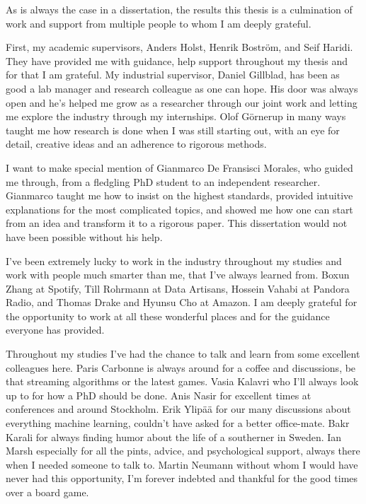 \begin{acknowledgements}


As is always the case in a dissertation, the results this thesis is
a culmination of work and support from multiple people to whom I am
deeply grateful.

First, my academic supervisors, Anders Holst, Henrik Bostr\"{o}m, and Seif Haridi.
They have provided me with guidance, help support throughout my thesis and for
that I am grateful.
My industrial supervisor, Daniel Gillblad, has been as good a lab manager and
research colleague as one can hope. His door was always open and he's helped me
grow as a researcher through our joint work and letting me explore the industry through my
internships. Olof G\"{o}rnerup in many ways taught me how research is done when I
was still starting out, with an eye for detail, creative ideas and an adherence to rigorous
methods.

I want to make special mention of Gianmarco De Fransisci Morales, who
guided me through, from a fledgling PhD student to an independent researcher.
Gianmarco taught me how to insist on the highest standards, provided intuitive
explanations for the most complicated topics, and showed me how one can start
from an idea and transform it to a rigorous paper. This dissertation would
not have been possible without his help.

I've been extremely lucky to work in the industry throughout
my studies and work with people much smarter than me, that I've always learned
from. Boxun Zhang at Spotify, Till Rohrmann at Data Artisans, Hossein Vahabi
at Pandora Radio, and Thomas Drake and Hyunsu Cho at Amazon.
I am deeply grateful for the opportunity to work at all these wonderful
places and for the guidance everyone has provided.

Throughout my studies I've had the chance to talk and learn from some
excellent colleagues here. Paris Carbonne is always around
for a coffee and discussions, be that streaming algorithms or the latest
games. Vasia Kalavri who I'll always look up to for how a PhD should be done.
Anis Nasir for excellent times at conferences and around Stockholm.
Erik Ylip\"{a}\"{a} for our many discussions about everything machine
learning, couldn't have asked for a better office-mate.
Bakr Karali for always finding humor about the life of a southerner
in Sweden. Ian Marsh especially for all the pints, advice, and
psychological support, always there when I needed someone to talk to.
Martin Neumann without whom I would have never had this opportunity,
I'm forever indebted and thankful for the good times over a board game.


\end{acknowledgements}
